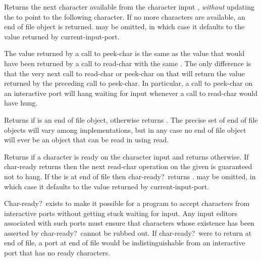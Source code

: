 \begin{entry}{%
}

Returns the next character available from the character input ,
{\em without} updating
the  to point to the following character.  If no more characters
are available, an end of file object is returned.   may be
omitted, in which case it defaults to the value returned by {\cf current-input-port}.

\begin{note}
The value returned by a call to {\cf peek-char} is the same as the
value that would have been returned by a call to {\cf read-char} with the
same .  The only difference is that the very next call to
{\cf read-char} or {\cf peek-char} on that  will return the
value returned by the preceding call to {\cf peek-char}.  In particular, a call
to {\cf peek-char} on an interactive port will hang waiting for input
whenever a call to {\cf read-char} would have hung.
\end{note}

\end{entry}


\begin{entry}{%
}

Returns \schtrue{} if  is an end of file object, otherwise returns
\schfalse.  The precise set of end of file objects will vary among
implementations, but in any case no end of file object will ever be an object
that can be read in using {\cf read}.

\end{entry}


\begin{entry}{%
}

Returns \schtrue{} if a character is ready on the character input  and
returns \schfalse{} otherwise.  If {\cf char-ready} returns \schtrue{} then
the next {\cf read-char} operation on the given  is guaranteed
not to hang.  If the  is at end of file then {\cf char-ready?}\
returns \schtrue.   may be omitted, in which case it defaults to
the value returned by {\cf current-input-port}.

\begin{rationale}
{\cf Char-ready?}\ exists to make it possible for a program to
accept characters from interactive ports without getting stuck waiting for
input.  Any input editors associated with such ports must ensure that
characters whose existence has been asserted by {\cf char-ready?}\ cannot
be rubbed out.  If {\cf char-ready?}\ were to return \schfalse{} at end of
file, a port at end of file would be indistinguishable from an interactive
port that has no ready characters.
\end{rationale}
\end{entry}

